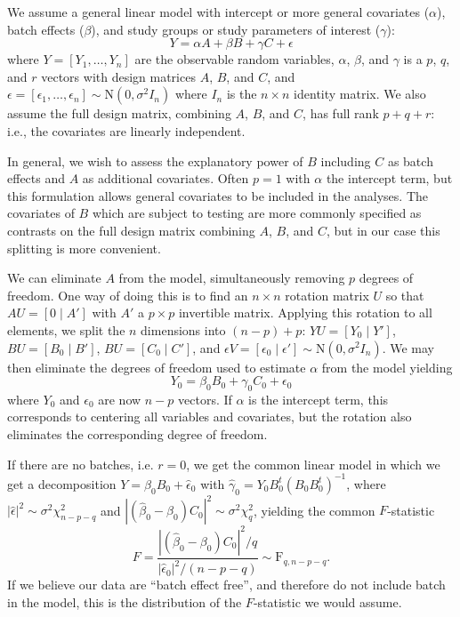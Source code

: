 \documentclass{bio}
\begin{document}
We assume a general linear model with intercept or more general covariates ($\alpha$), batch effects ($\beta$), and study groups or study parameters of interest ($\gamma$):
\begin{equation}
Y=\alpha A+\beta B+\gamma C+\epsilon
\end{equation}
where $Y=[Y_1,\ldots,Y_n]$ are the observable random variables, $\alpha$, $\beta$, and $\gamma$ is a $p$, $q$, and $r$ vectors with design matrices $A$, $B$, and $C$, and $\epsilon=[\epsilon_1,\ldots,\epsilon_n]\sim\text{N}(0,\sigma^2I_n)$ where $I_n$ is the $n\times n$ identity matrix. We also assume the full design matrix, combining $A$, $B$, and $C$, has full rank $p+q+r$: i.e., the covariates are linearly independent.

In general, we wish to assess the explanatory power of $B$ including $C$ as batch effects and $A$ as additional covariates. Often $p=1$ with $\alpha$ the intercept term, but this formulation allows general covariates to be included in the analyses. The covariates of $B$ which are subject to testing are more commonly specified as contrasts on the full design matrix combining $A$, $B$, and $C$, but in our case this splitting is more convenient.

We can eliminate $A$ from the model, simultaneously removing $p$ degrees of freedom. One way of doing this is to find an $n\times n$ rotation matrix $U$ so that $AU=[0\mid A']$ with $A'$ a $p\times p$ invertible matrix. Applying this rotation to all elements, we split the $n$ dimensions into $(n-p)+p$:  $YU=[Y_0\mid Y']$, $BU=[B_0\mid B']$, $BU=[C_0\mid C']$, and $\epsilon V=[\epsilon_0\mid\epsilon']\sim\text{N}(0,\sigma^2 I_n)$. We may then eliminate the degrees of freedom used to estimate $\alpha$ from the model yielding
\begin{equation}
Y_0=\beta_0 B_0+\gamma_0 C_0+\epsilon_0
\end{equation}
where $Y_0$ and $\epsilon_0$ are now $n-p$ vectors. If $\alpha$ is the intercept term, this corresponds to centering all variables and covariates, but the rotation also eliminates the corresponding degree of freedom.

If there are no batches, i.e. $r=0$, we get the common linear model in which we get a decomposition $Y=\hat\beta_0B_0+\hat\epsilon_0$ with $\hat\gamma_0=Y_0B_0^t(B_0B_0^t)^{-1}$, where
$|\hat\epsilon|^2\sim\sigma^2\chi^2_{n-p-q}$ and $|(\hat\beta_0-\beta_0)C_0|^2\sim\sigma^2\chi^2_q$, yielding the common
$F$-statistic
\begin{equation}
F=\frac{|(\hat\beta_0-\beta_0)C_0|^2/q}{|\hat\epsilon_0|^2/(n-p-q)}\sim\text{F}_{q,n-p-q}.
\end{equation}
If we believe our data are  ``batch effect free'', and therefore do not include batch in the model, this is the distribution of the $F$-statistic we would assume.
\end{document}
